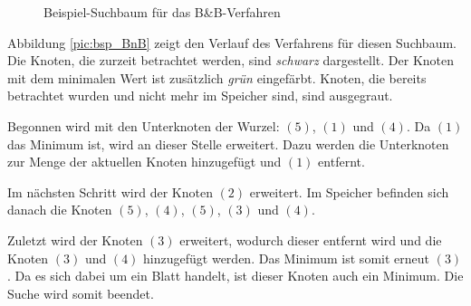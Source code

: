\begin{figure}[htb]
\centering
{}
\caption{Beispiel-Suchbaum für das B\&B-Verfahren}
\label{pic:bsp_BnB_1}
\end{figure}

Abbildung \ref{pic:bsp_BnB} zeigt den Verlauf des Verfahrens für diesen Suchbaum. 
Die Knoten, die zurzeit betrachtet werden, sind \emph{schwarz} dargestellt. 
Der Knoten mit dem minimalen Wert ist zusätzlich \emph{grün} eingefärbt. Knoten, 
die bereits betrachtet wurden und nicht mehr im Speicher sind, sind ausgegraut.

Begonnen wird mit den Unterknoten der Wurzel: $(5)$, $(1)$ und 
$(4)$. Da $(1)$ das Minimum ist, wird an dieser Stelle erweitert. 
Dazu werden die Unterknoten zur Menge der aktuellen Knoten 
hinzugefügt und $(1)$ entfernt.

Im nächsten Schritt wird der Knoten $(2)$ erweitert. Im Speicher 
befinden sich danach die Knoten $(5)$, $(4)$, $(5)$, $(3)$ und 
$(4)$. 

Zuletzt wird der Knoten $(3)$ erweitert, wodurch dieser entfernt 
wird und die Knoten $(3)$ und $(4)$ hinzugefügt werden. Das 
Minimum ist somit erneut $(3)$. Da es sich dabei um ein Blatt 
handelt, ist dieser Knoten auch ein Minimum. Die Suche wird somit 
beendet.

